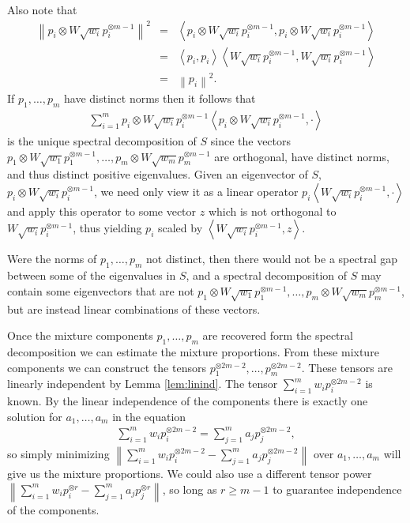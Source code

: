 \documentclass[aos,preprint]{imsart}
\def\l{\left}
\def\r{\right}
\theoremstyle{plain}
\theoremstyle{defintion}
\begin{document}
Also note that 
\begin{eqnarray*}
	\l\| p_i\otimes W \sqrt{w_i} p_i^{\otimes m-1} \r\|^2
	&=&\l< p_i\otimes W \sqrt{w_i} p_i^{\otimes m-1} ,p_i\otimes W \sqrt{w_i} p_i^{\otimes m-1} \r>\\
	&=&\l< p_i ,p_i \r>\l<W \sqrt{w_i} p_i^{\otimes m-1},W \sqrt{w_i} p_i^{\otimes m-1} \r> \\
	       &=&\l\|p_i\r\|^2.
\end{eqnarray*}
If $p_1,\ldots,p_m$ have distinct norms then it follows that 
\begin{align*}
    \sum_{i=1}^m  p_i\otimes W \sqrt{w_i}p_i^{\otimes m-1} \l< p_i\otimes W \sqrt{w_i}p_i^{\otimes m-1},\cdot\r>
\end{align*}
is the unique spectral decomposition of $S$ since the vectors $ p_1\otimes W \sqrt{w_1}p_1^{\otimes m-1},\ldots,  p_m\otimes W \sqrt{w_m}p_m^{\otimes m-1}$ are orthogonal, have distinct norms, and thus distinct positive eigenvalues. Given an eigenvector of $S$, $p_i\otimes W \sqrt{w_i} p_i^{\otimes m-1}$, we need only view it as a linear operator $p_i\l< W \sqrt{w_i} p_i^{\otimes m-1},\cdot\r>$ and apply this operator to some vector $z$ which is not orthogonal to $W \sqrt{w_i} p_i^{\otimes m-1}$, thus yielding $p_i$ scaled by $ \l<W \sqrt{w_i} p_i^{\otimes m-1},z\r>$.

Were the norms of $p_1,\ldots,p_m$ not distinct, then there would not be a spectral gap between some of the eigenvalues in $S$, and a spectral decomposition of $S$ may contain some eigenvectors that are not $ p_1\otimes W \sqrt{w_1}p_1^{\otimes m-1},\ldots,  p_m\otimes W \sqrt{w_m}p_m^{\otimes m-1}$, but are instead linear combinations of these vectors.

Once the mixture components $p_1,\ldots,p_m$ are recovered form the spectral decomposition we can estimate the mixture proportions. From these mixture components we can construct the tensors $p_1^{\otimes 2m-2}, \ldots , p_m^{\otimes 2m-2}$. These tensors are linearly independent by Lemma \ref{lem:linind}. The tensor $ \sum_{i=1}^m w_i p_i^{\otimes 2m-2}$ is known. By the linear independence of the components there is exactly one solution for $a_1,\ldots, a_m$ in the equation
\begin{eqnarray*}
	\sum_{i=1}^m w_i p_i^{\otimes 2m-2} = \sum_{j=1}^m a_j p_j^{\otimes 2m-2},
\end{eqnarray*}
so simply minimizing $\l\|\sum_{i=1}^m w_i p_i^{\otimes 2m-2} - \sum_{j=1}^m a_j p_j^{\otimes 2m-2}\r\|$ over $a_1,\ldots,a_m$ will give us the mixture proportions. We could also use a different tensor power $\l\|\sum_{i=1}^m w_i p_i^{\otimes r} - \sum_{j=1}^m a_j p_j^{\otimes r}\r\|$, so long as $r\ge m-1$ to guarantee independence of the components.
\end{document}
